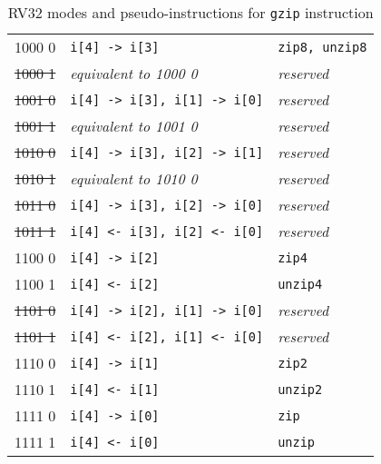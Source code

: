 \begin{table}[h]
\begin{small}
\begin{center}
\begin{tabular}{c l l}
      1000 0  & {\tt i[4] -> i[3]}               & {\tt zip8, unzip8}     \\
\sout{1000 1} & {\it equivalent to 1000 0}       & {\it reserved}         \\
\sout{1001 0} & {\tt i[4] -> i[3], i[1] -> i[0]} & {\it reserved}         \\
\sout{1001 1} & {\it equivalent to 1001 0}       & {\it reserved}         \\
\sout{1010 0} & {\tt i[4] -> i[3], i[2] -> i[1]} & {\it reserved}         \\
\sout{1010 1} & {\it equivalent to 1010 0}       & {\it reserved}         \\
\sout{1011 0} & {\tt i[4] -> i[3], i[2] -> i[0]} & {\it reserved}         \\
\sout{1011 1} & {\tt i[4] <- i[3], i[2] <- i[0]} & {\it reserved}         \\

\hline

      1100 0  & {\tt i[4] -> i[2]}               & {\tt zip4}             \\
      1100 1  & {\tt i[4] <- i[2]}               & {\tt unzip4}           \\
\sout{1101 0} & {\tt i[4] -> i[2], i[1] -> i[0]} & {\it reserved}         \\
\sout{1101 1} & {\tt i[4] <- i[2], i[1] <- i[0]} & {\it reserved}         \\
      1110 0  & {\tt i[4] -> i[1]}               & {\tt zip2}             \\
      1110 1  & {\tt i[4] <- i[1]}               & {\tt unzip2}           \\
      1111 0  & {\tt i[4] -> i[0]}               & {\tt zip}              \\
      1111 1  & {\tt i[4] <- i[0]}               & {\tt unzip}            \\
\end{tabular}
\end{center}
\end{small}
\caption{RV32 modes and pseudo-instructions for {\tt gzip} instruction}
\label{gzip32-modes}
\end{table}

